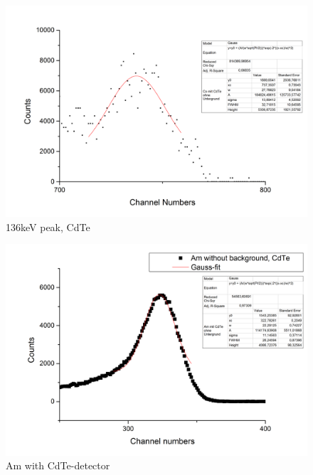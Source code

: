 \begin{figure}[h]
\begin{center}
\includegraphics[scale=0.15]{Bilder/Teil3/136keV_CdTe}
\caption{136keV peak, CdTe}
\label{fig:CdTe}
\end{center}
\end{figure}
\begin{figure}[h]
\begin{center}
\includegraphics[scale=0.15]{Bilder/Teil3/Am_Cd}
\caption{Am with CdTe-detector}
\label{fig:AmCdTe}
\end{center}
\end{figure}
